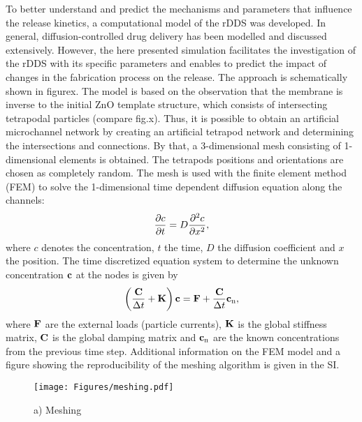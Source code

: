 \documentclass{article}
\begin{document}

  To better understand and predict the mechanisms and parameters that influence the release kinetics, a computational model of the rDDS was developed. In general, diffusion-controlled drug delivery has been modelled and discussed extensively. However, the here presented simulation facilitates the investigation of the rDDS with its specific parameters and enables to predict the impact of changes in the fabrication process on the release. The approach is schematically shown in figurex. The model is based on the observation that the membrane is inverse to the initial ZnO template structure, which consists of intersecting tetrapodal particles (compare fig.x). Thus, it is possible to obtain an artificial microchannel network by creating an artificial tetrapod network and determining the intersections and connections. By that, a 3-dimensional mesh consisting of 1-dimensional elements is obtained. The tetrapods positions and orientations are chosen as completely random. The mesh is used with the finite element method (FEM) to solve the 1-dimensional time dependent diffusion equation along the channels: 
  \begin{equation}
    \frac{\partial c}{\partial t} = D \frac{\partial^2c}{\partial{x}^2},
  \end{equation}
  where $c$ denotes the concentration, $t$ the time, $D$ the diffusion coefficient and $x$ the position. The time discretized equation system to determine the unknown concentration $\boldsymbol{\rm c}$ at the nodes is given by
  \begin{equation}
    \left(\frac{\boldsymbol{\rm C}}{\Delta t}+\boldsymbol{\rm K} \right) \boldsymbol{\rm c} = \boldsymbol{\rm F}+\frac{\boldsymbol{\rm C}}{\Delta t}\boldsymbol{\rm c}_{\rm n},
  \end{equation}
  where $\boldsymbol{\rm F}$ are the external loads (particle currents), $\boldsymbol{\rm K}$ is the global stiffness matrix, $\boldsymbol{\rm C}$ is the global damping matrix and $\boldsymbol{\rm c}_{\rm n}$ are the known concentrations from the previous time step. Additional information on the FEM model and a figure showing the reproducibility of the meshing algorithm is given in the SI. 

  \begin{figure}[h!]
    \centering
    \texttt{[image: Figures/meshing.pdf]}
    \caption[]{a) Meshing }
  \end{figure}
\end{document}
